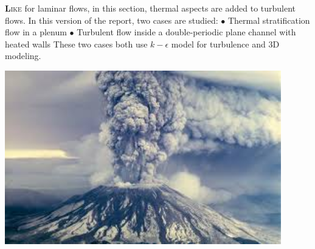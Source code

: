 \lettrine[lines=2,slope=0pt,nindent=4pt]{\textbf{L}}{ike} for laminar flows, in this section,
thermal aspects are added to turbulent flows.
In this version of the report, two cases are studied:\vspace*{0.3cm}\newline
\hspace*{0.5cm} $\bullet$ Thermal stratification flow in a plenum\vspace*{0.3cm}\newline
\hspace*{0.5cm} $\bullet$ Turbulent flow inside a double-periodic plane channel with heated walls\vspace*{0.3cm}\newline
These two cases both use $k-\epsilon$ model for turbulence and 3D modeling.\vspace*{2cm}\newline
\begin{center}\includegraphics[width=12cm]{tools/volcan.png}\end{center}
